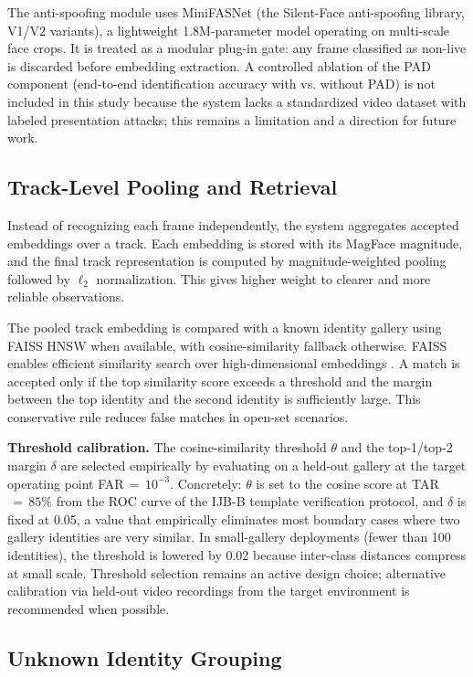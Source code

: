 The anti-spoofing module uses MiniFASNet (the Silent-Face anti-spoofing library, V1/V2 variants), a lightweight 1.8M-parameter model operating on multi-scale face crops. It is treated as a modular plug-in gate: any frame classified as non-live is discarded before embedding extraction. A controlled ablation of the PAD component (end-to-end identification accuracy with vs. without PAD) is not included in this study because the system lacks a standardized video dataset with labeled presentation attacks; this remains a limitation and a direction for future work.

\subsection{Track-Level Pooling and Retrieval}

Instead of recognizing each frame independently, the system aggregates accepted embeddings over a track. Each embedding is stored with its MagFace magnitude, and the final track representation is computed by magnitude-weighted pooling followed by $\ell_2$ normalization. This gives higher weight to clearer and more reliable observations.

The pooled track embedding is compared with a known identity gallery using FAISS HNSW when available, with cosine-similarity fallback otherwise. FAISS enables efficient similarity search over high-dimensional embeddings \cite{faiss}. A match is accepted only if the top similarity score exceeds a threshold and the margin between the top identity and the second identity is sufficiently large. This conservative rule reduces false matches in open-set scenarios.

\textbf{Threshold calibration.} The cosine-similarity threshold $\theta$ and the top-1/top-2 margin $\delta$ are selected empirically by evaluating on a held-out gallery at the target operating point FAR$\,{=}\,10^{-3}$. Concretely: $\theta$ is set to the cosine score at TAR$\,{=}\,85\%$ from the ROC curve of the IJB-B template verification protocol, and $\delta$ is fixed at 0.05, a value that empirically eliminates most boundary cases where two gallery identities are very similar. In small-gallery deployments (fewer than 100 identities), the threshold is lowered by 0.02 because inter-class distances compress at small scale. Threshold selection remains an active design choice; alternative calibration via held-out video recordings from the target environment is recommended when possible.

\subsection{Unknown Identity Grouping}


